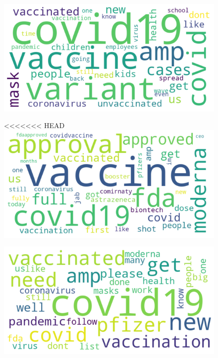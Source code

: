 \documentclass[12pt,%
               a4paper,%
               oneside,openany,%
               titlepage,%
               headinclude,footinclude,%
               BCOR5mm,%
               cleardoublepage=empty,%
               tablecaptionabove,%
               floatperchapter,
               ]{scrreprt}                 %
\begin{document}
\begin{figure}[ht]
\begin{minipage}[b]{0.5\linewidth}
    \vspace{4ex}
  \end{minipage}
  \begin{minipage}[b]{0.5\linewidth}
    \centering
    \includegraphics[width=.9\linewidth]{Figures/WordCloud_delta.png}
    \vspace{4ex}
  \end{minipage}
  \begin{minipage}[b]{0.5\linewidth}
    \centering
<<<<<<< HEAD
    \includegraphics[width=.9\linewidth]{Figures/WordCloud_pfizer.png} 
    \vspace{4ex}
  \end{minipage} 
  \begin{minipage}[b]{0.5\linewidth}
    \centering
    \includegraphics[width=.9\linewidth]{Figures/WordCloud_Vaccine.png} 

\end{minipage}
\end{figure}
\end{document}
